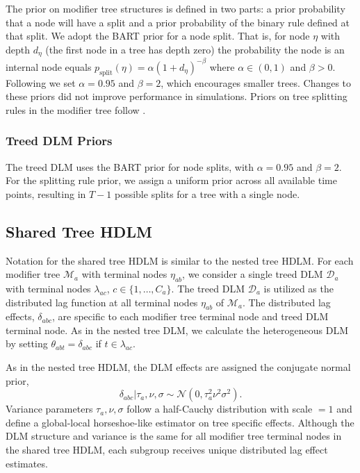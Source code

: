 \documentclass[12pt]{article}
\begin{document}
The prior on modifier tree structures is defined in two parts: a prior probability that a node will have a split and a prior probability of the binary rule defined at that split. We adopt the BART prior for a node split. That is, for node $\eta$ with depth $d_\eta$ (the first node in a tree has depth zero) the probability the node is an internal node equals $p_{\text{split}}(\eta)=\alpha(1+d_\eta)^{-\beta}$ where $\alpha\in(0,1)$ and $\beta>0$. Following \cite{Chipman2012} we set $\alpha=0.95$ and $\beta=2$, which encourages smaller trees. Changes to these priors did not improve performance in simulations. Priors on tree splitting rules in the modifier tree follow \cite{Linero2018b}.

\subsubsection{Treed DLM Priors}

The treed DLM uses the BART prior for node splits, with $\alpha=0.95$ and $\beta=2$. For the splitting rule prior, we assign a uniform prior across all available time points, resulting in $T-1$ possible splits for a tree with a single node.



\subsection{Shared Tree HDLM}
Notation for the shared tree HDLM is similar to the nested tree HDLM. For each modifier tree $\mathcal{M}_a$ with terminal nodes $\eta_{ab}$, we consider a single treed DLM $\mathcal{D}_a$ with terminal nodes $\lambda_{ac}$, $c\in\{1,\ldots,C_a\}$. The treed DLM $\mathcal{D}_a$ is utilized as the distributed lag function at all terminal nodes $\eta_{ab}$ of $\mathcal{M}_a$. The distributed lag effects, $\delta_{abc}$, are specific to each modifier tree terminal node and treed DLM terminal node. As in the nested tree DLM, we calculate the heterogeneous DLM by setting $\theta_{abt}=\delta_{abc}$ if $t\in\lambda_{ac}$.


As in the nested tree HDLM, the DLM effects are assigned the conjugate normal prior,
\begin{equation}
    \delta_{abc}|\tau_a,\nu,\sigma\sim\mathcal{N}(0,\tau_a^2\nu^2\sigma^2).
\end{equation}
Variance parameters $\tau_a,\nu,\sigma$ follow a half-Cauchy distribution with scale $=1$ and define a global-local horseshoe-like estimator on tree specific effects. Although the DLM structure and variance is the same for all modifier tree terminal nodes in the shared tree HDLM, each subgroup receives unique distributed lag effect estimates.
\end{document}
